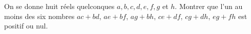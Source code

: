 On se donne huit réels quelconques $a, b, c, d, e, f, g$ et $h$. Montrer que l'un au moins des six nombres $ac + bd$, $ae + bf$, $ag + bh$, $ce + df$, $cg + dh$, $eg + fh$ est positif ou nul.
